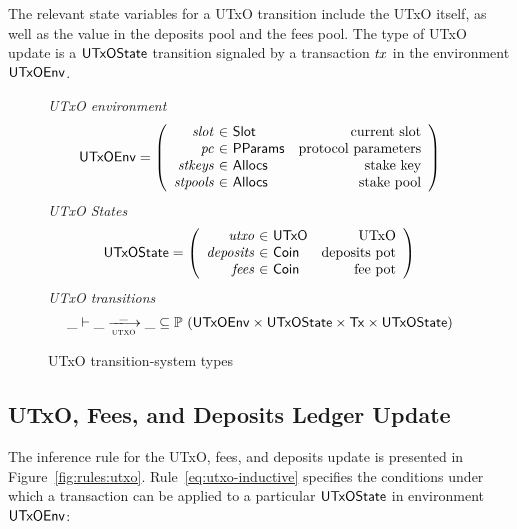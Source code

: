 \documentclass[11pt,a4paper,dvipsnames]{article}
\newcommand{\Tx}{\type{Tx}}
\newcommand{\UTxO}{\type{UTxO}}
\newcommand{\Coin}{\type{Coin}}
\newcommand{\PParams}{\type{PParams}}
\newcommand{\Slot}{\type{Slot}}
\newcommand{\Allocs}{\type{Allocs}}
\newcommand{\UTxOState}{\ensuremath{\type{UTxOState}}}
\newcommand{\UTxOEnv}{\type{UTxOEnv}}
\theoremstyle{definition}
\theoremstyle{definition}
\begin{document}
The relevant state variables for a UTxO transition include the UTxO itself,
as well as the value in the deposits pool and the fees pool.
The type of UTxO update is a $\UTxOState$ transition signaled by
a transaction $\mathit{tx}$ in the environment $\UTxOEnv$.


\begin{figure}
  \emph{UTxO environment}
  \begin{equation*}
    \UTxOEnv =
    \left(
      \begin{array}{r@{~\in~}lr}
        \var{slot} & \Slot & \text{current slot}\\
        \var{pc} & \PParams & \text{protocol parameters}\\
        \var{stkeys} & \Allocs & \text{stake key}\\
        \var{stpools} & \Allocs & \text{stake pool}\\
      \end{array}
    \right)
  \end{equation*}
  \emph{UTxO States}
  \begin{equation*}
    \UTxOState =
    \left(
      \begin{array}{r@{~\in~}lr}
        \var{utxo} & \UTxO & \text{UTxO}\\
        \var{deposits} & \Coin & \text{deposits pot}\\
        \var{fees} & \Coin & \text{fee pot}\\
      \end{array}
    \right)
  \end{equation*}
  \emph{UTxO transitions}
  \begin{equation*}
    \_ \vdash
    \var{\_} \trans{utxo}{\_} \var{\_}
    \subseteq \powerset (\UTxOEnv \times \UTxOState \times \Tx \times \UTxOState)
  \end{equation*}
  \caption{UTxO transition-system types}
  \label{fig:ts-types:utxo}
\end{figure}

\clearpage

\subsection{UTxO, Fees, and Deposits Ledger Update}
\label{sec:utxo-ufd}

The inference rule for the UTxO, fees, and deposits update is presented in
Figure~\ref{fig:rules:utxo}.
Rule~\ref{eq:utxo-inductive} specifies the conditions under which a transaction can
be applied to a particular $\UTxOState$ in environment $\UTxOEnv$:
\end{document}

